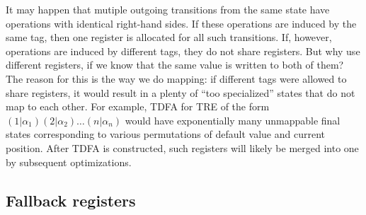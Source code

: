 \documentclass{article}
\theoremstyle{definition}
\begin{document}
\begin{multicols}{2}
It may happen that mutiple outgoing transitions from the same state have operations with identical right-hand sides.
If these operations are induced by the same tag, then one register is allocated for all such transitions.
If, however, operations are induced by different tags, they do not share registers.
But why use different registers, if we know that the same value is written to both of them?
The reason for this is the way we do mapping: if different tags were allowed to share registers,
it would result in a plenty of ``too specialized'' states that do not map to each other.
For example, TDFA for TRE of the form $(1 | \alpha_1) (2 | \alpha_2) \dots (n | \alpha_n)$
would have exponentially many unmappable final states
corresponding to various permutations of default value and current position.
After TDFA is constructed, such registers will likely be merged into one by subsequent optimizations.

\subsection*{Fallback registers}


\end{multicols}
\end{document}
